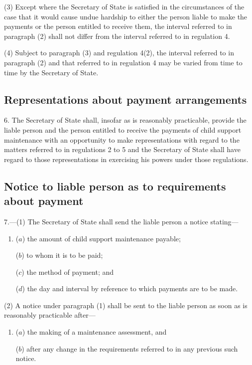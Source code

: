 \documentclass[12pt,a4paper]{article}
\begin{document}
(3) Except where the Secretary of State is satisfied in the circumstances of the case that it would cause undue hardship to either the person liable to make the payments or the person entitled to receive them, the interval referred to in paragraph (2) shall not differ from the interval referred to in regulation 4.

(4) Subject to paragraph (3) and regulation 4(2), the interval referred to in paragraph (2) and that referred to in regulation 4 may be varied from time to time by the Secretary of State.


\subsection[6. Representations about payment arrangements]{Representations about payment arrangements}

6.  The Secretary of State shall, insofar as is reasonably practicable, provide the liable person and the person entitled to receive the payments of child support maintenance with an opportunity to make representations with regard to the matters referred to in regulations 2 to 5 and the Secretary of State shall have regard to those representations in exercising his powers under those regulations.

\subsection[7. Notice to liable person as to requirements about payment]{Notice to liable person as to requirements about payment}

7.—(1) The Secretary of State shall send the liable person a notice stating—
\begin{enumerate}\item[]
($a$) the amount of child support maintenance payable;

($b$) to whom it is to be paid;

($c$) the method of payment; and

($d$) the day and interval by reference to which payments are to be made.
\end{enumerate}

(2) A notice under paragraph (1) shall be sent to the liable person as soon as is reasonably practicable after—
\begin{enumerate}\item[]
($a$) the making of a maintenance assessment, and

($b$) after any change in the requirements referred to in any previous such notice.
\end{enumerate}
\end{document}
